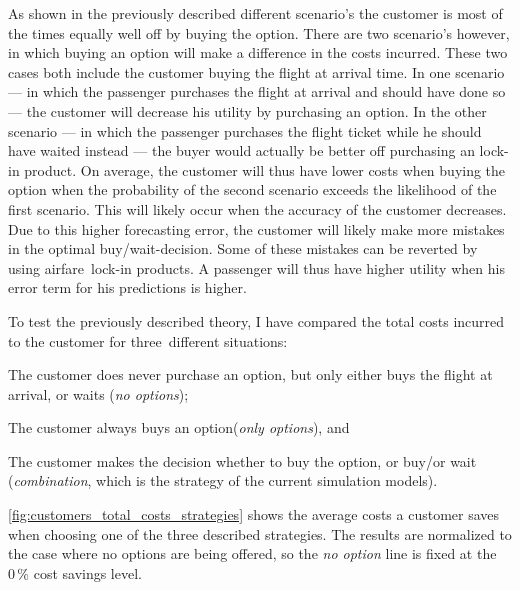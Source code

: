 As shown in the previously described different scenario's the customer is most of the times equally well off by buying the option. There are two scenario's however, in which buying an option will make a difference in the costs incurred. These two cases both include the customer buying the flight at arrival time. In one scenario --- in which the passenger purchases the flight at arrival and should have done so --- the customer will decrease his utility by purchasing an option. In the other scenario --- in which the passenger purchases the flight ticket while he should have waited instead --- the buyer would actually be better off purchasing an lock-in product. On average, the customer will thus have lower costs when buying the option when the probability of the second scenario exceeds the likelihood of the first scenario. This will likely occur when the accuracy of the customer decreases. Due to this higher forecasting error, the customer will likely make more mistakes in the optimal buy/wait-decision. Some of these mistakes can be reverted by using airfare~lock-in products. A passenger will thus have higher utility when his error term for his predictions is higher.

To test the previously described theory, I have compared the total costs incurred to the customer for three~different situations:
\begin{compactitem}
    \item The customer does never purchase an option, but only either buys the flight at arrival, or waits (\emph{no options});
    \item The customer always buys an option(\emph{only options}), and
    \item The customer makes the decision whether to buy the option, or buy/or wait (\emph{combination}, which is the strategy of the current simulation models).
\end{compactitem}

\autoref{fig:customers_total_costs_strategies} shows the average costs a customer saves when choosing one of the three described strategies. The results are normalized to the case where no options are being offered, so the \emph{no option} line is fixed at the $0\,\%$ cost savings level.


